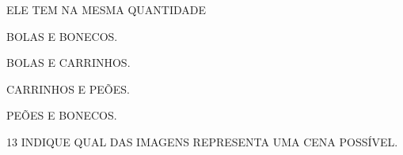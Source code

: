 ELE TEM NA MESMA QUANTIDADE

\begin{multicols}{2}
\begin{escolha}[itemsep=0pt]
\item BOLAS E BONECOS.

\item BOLAS E CARRINHOS.

\item CARRINHOS E PEÕES.

\item PEÕES E BONECOS.
\end{escolha}
\end{multicols}

\pagebreak

\num{13} INDIQUE QUAL DAS IMAGENS REPRESENTA UMA CENA POSSÍVEL.


